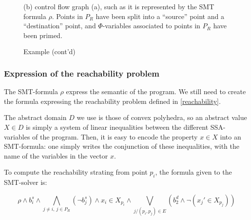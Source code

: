 \documentclass[a4paper,english,titlepage,11pt]{report}
\begin{document}
\begin{figure}[!h]
\begin{minipage}[c]{.49\linewidth}

(b) control flow graph (a), such as it is represented by the SMT formula $\rho$.
Points in $P_R$ have been split into a ``source'' point and a ``destination''
point, and $\Phi$-variables associated to points in $P_R$ have been primed.
\end{minipage} 
\caption{Example (cont'd)}
\label{multigraphGopan}
\end{figure}

	\subsubsection{Expression of the reachability problem}

	The SMT-formula $\rho$ express the semantic of the program. We still need to create the
	formula expressing the reachability problem defined in \ref{reachability}.

	The abstract domain $D$ we use is those of convex polyhedra, so an abstract
	value $X \in D$ is simply a system of linear inequalities between the
	different SSA-variables of the program. Then, it is easy to encode the
	property $x \in X$ into an SMT-formula: one simply writes the conjunction of
	these inequalities, with the name of the variables in the vector $x$.

	To compute the reachability strating from point $p_i$, the formula given to
	the SMT-solver is:

	$$\rho \wedge b_i^s \wedge \bigwedge_{j\neq i,\ j\in P_R} (\neg b_j^s)
	\wedge x_i \in X_{p_i} \wedge \bigvee_{j/(p_i,p_j)\in E} (b_2^d \wedge \neg
	(x_j' \in X_{p_j}))$$
\end{document}
